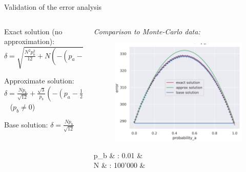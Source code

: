 \documentclass{ikpKoeln}
\begin{document}
\begin{frame}[t]{Validation of the error analysis}
	\begin{columns}[t]
		\begin{column}{0.5\textwidth}
			\begin{alertblock}{\small Exact solution (no approximation):}
				\centering
				\small$\delta = \sqrt{\frac{N^2p_b^2}{12} + N \left( -(p_a - \frac{1-p_b}{2})^2 + \frac{1}{4} - \frac{p_b}{6} - \frac{p_b^2}{12} \right)}$
			\end{alertblock}
			\begin{exampleblock}{\small Approximate solution:}
				\centering
				\small$\delta = \frac{Np_b}{\sqrt{12}} + \frac{\sqrt{3}}{p_b}(-(p_a - \frac{1}{2})^2 + \frac{1}{4})$ \,\,\, ($p_b \neq 0$)
			\end{exampleblock}
			\begin{block}{\small Base solution:}
				\centering
				\small$\delta = \frac{Np_b}{\sqrt{12}}$
			\end{block}
		\end{column}
		\begin{column}{0.45\textwidth}
			\vspace*{-1.5em}

			\flushleft \textit{Comparison to Monte-Carlo data:}
			\begin{figure}
				\includegraphics[width = \textwidth]{ neulandMeeting/mapcal_error_validation.png}
			\end{figure}
			\vspace*{-2em}
			{
				\small
				\begin{flalign*}
					p_b & : 0.01    & \\
					N   & : 100'000 & \\
				\end{flalign*}
			}
		\end{column}
	\end{columns}
\end{frame}
\end{document}

